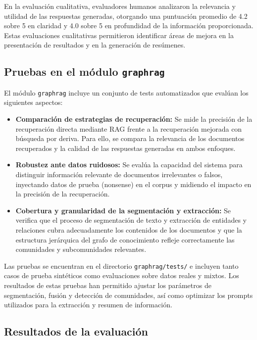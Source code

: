 \documentclass[12pt]{article}
\begin{document}
En la evaluación cualitativa, evaluadores humanos analizaron la relevancia y utilidad de las respuestas generadas, otorgando una puntuación promedio de 4.2 sobre 5 en claridad y 4.0 sobre 5 en profundidad de la información proporcionada. Estas evaluaciones cualitativas permitieron identificar áreas de mejora en la presentación de resultados y en la generación de resúmenes.

\subsection{Pruebas en el módulo \texttt{graphrag}}

El módulo \texttt{graphrag} incluye un conjunto de tests automatizados que evalúan los siguientes aspectos:

\begin{itemize}
    \item \textbf{Comparación de estrategias de recuperación:} Se mide la precisión de la recuperación directa mediante RAG frente a la recuperación mejorada con búsqueda por deriva. Para ello, se compara la relevancia de los documentos recuperados y la calidad de las respuestas generadas en ambos enfoques.
    \item \textbf{Robustez ante datos ruidosos:} Se evalúa la capacidad del sistema para distinguir información relevante de documentos irrelevantes o falsos, inyectando datos de prueba (nonsense) en el corpus y midiendo el impacto en la precisión de la recuperación.
    \item \textbf{Cobertura y granularidad de la segmentación y extracción:} Se verifica que el proceso de segmentación de texto y extracción de entidades y relaciones cubra adecuadamente los contenidos de los documentos y que la estructura jerárquica del grafo de conocimiento refleje correctamente las comunidades y subcomunidades relevantes.
\end{itemize}

Las pruebas se encuentran en el directorio \texttt{graphrag/tests/} e incluyen tanto casos de prueba sintéticos como evaluaciones sobre datos reales y mixtos. Los resultados de estas pruebas han permitido ajustar los parámetros de segmentación, fusión y detección de comunidades, así como optimizar los prompts utilizados para la extracción y resumen de información.

\subsection{Resultados de la evaluación}
\end{document}
